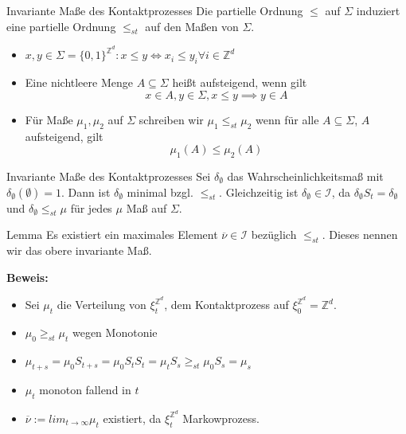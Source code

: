 \documentclass[11pt]{beamer}
\begin{document}
\begin{frame}{Invariante Maße des Kontaktprozesses}
    Die partielle Ordnung $\leq$ auf $\Sigma$ induziert eine partielle Ordnung $\leq_{st}$ auf den Maßen von
    $\Sigma$.
    \begin{itemize}
        \item<2-> $x, y \in \Sigma = \{0, 1\}^{\mathbb{Z}^d}: x \leq y \iff x_i \leq y_i \forall i \in \mathbb{Z}^d$
        \item<3-> Eine nichtleere Menge $A \subseteq \Sigma$ heißt aufsteigend, wenn gilt
        \begin{equation*}
            x \in A, y \in \Sigma, x \leq y \implies y \in A
        \end{equation*}
        \item<3-> Für Maße $\mu_1, \mu_2$ auf $\Sigma$ schreiben wir $\mu_1 \leq_{st} \mu_2$ wenn
        für alle $A \subseteq \Sigma$, $A$ aufsteigend, gilt
        \begin{equation*}
            \mu_1(A) \leq \mu_2(A)
        \end{equation*}
    \end{itemize}
\end{frame}

\begin{frame}{Invariante Maße des Kontaktprozesses}
    Sei $\delta_\emptyset$ das Wahrscheinlichkeitsmaß mit $\delta_\emptyset(\emptyset) = 1$.
    Dann ist $\delta_\emptyset$ minimal bzgl. $\leq_{st}$. Gleichzeitig ist
    $\delta_\emptyset \in \mathcal{I}$, da $\delta_\emptyset S_t = \delta_\emptyset $ und
    $\delta_\emptyset \leq_{st} \mu$ für jedes $\mu$ Maß auf $\Sigma$.
    
    \begin{block}{Lemma}
        Es existiert ein maximales Element $\overline{\nu} \in \mathcal{I}$ bezüglich
        $\leq_{st}$. Dieses nennen wir das obere invariante Maß.
    \end{block}
    
    \textbf{Beweis:}
    \\
    \begin{itemize}
        \item<3-> Sei $\mu_t$ die Verteilung von $\xi_t^{\mathbb{Z}^d}$, dem Kontaktprozess
        auf $\xi_0^{\mathbb{Z}^d} = \mathbb{Z}^d$.
        \item<4-> $\mu_0 \geq_{st} \mu_t$ wegen Monotonie 
        \item<5-> $\mu_{t + s} = \mu_0S_{t + s} = \mu_0S_t S_t = \mu_t S_s \geq_{st} \mu_0 S_s = \mu_s$
        \item<6-> $\mu_t$ monoton fallend in $t$
        \item<7-> $\overline{\nu} := lim_{t \to \infty} \mu_t$ existiert, da
        $\xi_t^{\mathbb{Z}^d}$ Markowprozess.
    \end{itemize}
\end{frame}
\end{document}
